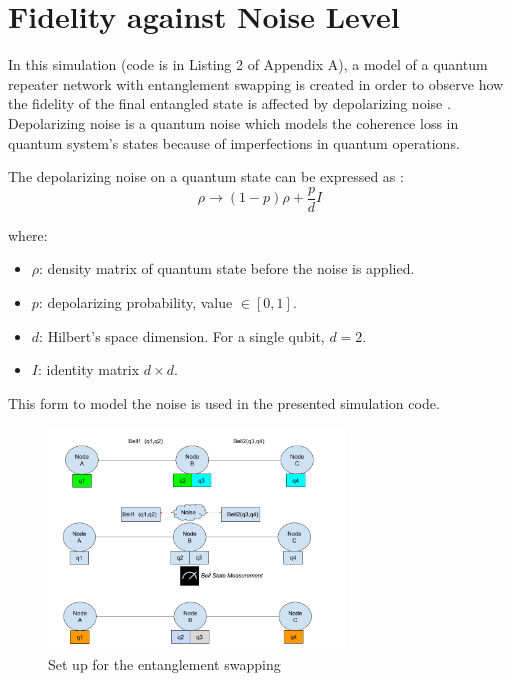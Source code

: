 		\section{Fidelity against Noise Level}	
		
		In this simulation (code is in Listing 2 of Appendix A), a model of a quantum repeater network with
		entanglement swapping is created in order to observe how the fidelity of the final entangled state is
		affected by depolarizing noise \cite{depolarization}. Depolarizing noise is a quantum noise which models the
		coherence loss in quantum system's states because of imperfections in quantum operations.
		
		The depolarizing noise on a quantum state can be expressed as \cite{depolar2}:
			\[
			\rho \to (1-p)\rho + \frac{p}{d}I
			\]

		where:

		\begin{itemize}
			    \item \( \rho \): density matrix of quantum state before the noise is applied.
			    \item \( p \): depolarizing probability,  value \(\in [0, 1]\).
			    \item \( d \): Hilbert's space dimension. For a single qubit, \( d = 2 \).
			    \item \( I \): identity matrix \( d \times d \).
		\end{itemize}

		This form to model the noise is used in the presented simulation code.
	
		\begin{figure}[h!]
			\centering
			\includegraphics[width=0.7\textwidth]{repeater/entanglement_swap.png}
			\caption{Set up for the entanglement swapping}
			\label{fig:}
		\end{figure}		


